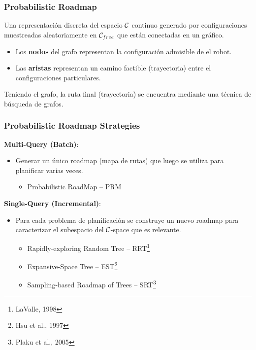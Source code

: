 \begin{frame}
	\frametitle{Probabilistic Roadmap}
	
	Una representación discreta del espacio $\mathcal{C}$ continuo generado por configuraciones muestreadas aleatoriamente en $\mathcal{C}_{free}$ que están conectadas
	en un gráfico.
	\begin{itemize}
		\item Los {\bf nodos} del grafo representan la configuración admisible de
		el robot.
		\item Las {\bf aristas} representan un camino factible (trayectoria) entre el
		configuraciones particulares.
	\end{itemize}

	Teniendo el grafo, la ruta final (trayectoria) se encuentra mediante una técnica de búsqueda de grafos.
\end{frame}

\begin{frame}
	\frametitle{Probabilistic Roadmap Strategies}
	
	{\bf Multi-Query (Batch)}:
	\begin{itemize}
	\item Generar un único roadmap (mapa de rutas) que luego se utiliza para planificar varias veces.
		\begin{itemize}
			\item Probabilistic RoadMap – PRM
		\end{itemize}
	\end{itemize}

	{\bf Single-Query (Incremental)}:
	\begin{itemize}
		\item Para cada problema de planificación se construye un nuevo roadmap para
		caracterizar el subespacio del $\mathcal{C}$-space que es relevante.
		\begin{itemize}
			\item Rapidly-exploring Random Tree -- RRT\footnote{LaValle, 1998}
			\item Expansive-Space Tree -- EST\footnote{Hsu et al., 1997}
			\item Sampling-based Roadmap of Trees – SRT\footnote{Plaku et al., 2005}
		\end{itemize}
	\end{itemize}

\end{frame}

